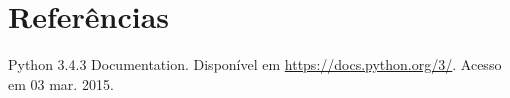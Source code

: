 \chapter{Referências}

Python 3.4.3 Documentation. Disponível em \url{https://docs.python.org/3/}. Acesso em 03 mar. 2015.
